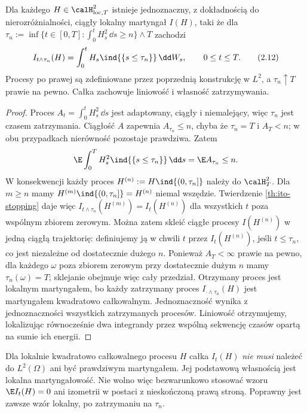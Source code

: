 \begin{twierdzenie}\label{th:ito-local}
Dla każdego $H\in\calH_{\mathrm{loc},T}^2$
istnieje jednoznaczny, z dokładnością do nierozróżnialności,
ciągły lokalny martyngał $I(H)$, taki że dla
$\tau_n:=\inf\{t\in[0,T]:\int_0^t H_s^2\,\dd s\ge n\}\wedge T$
zachodzi
\[
I_{t\wedge\tau_n}(H)
=\int_0^tH_s\ind{\{s\le\tau_n\}}\,\dd W_s,
\qquad 0\le t\le T.
\tag{2.12}
\]
Procesy po prawej są zdefiniowane przez
poprzednią konstrukcję w $L^2$, a $\tau_n\uparrow T$
prawie na pewno. Całka zachowuje liniowość i własność
zatrzymywania.
\end{twierdzenie}
\begin{proof}
Proces $A_t=\int_0^tH_s^2\,\dd s$ jest adaptowany,
ciągły i niemalejący, więc $\tau_n$ jest czasem
zatrzymania. Ciągłość $A$ zapewnia
$A_{\tau_n}\le n$, chyba że $\tau_n=T$ i $A_T<n$;
w obu przypadkach nierówność pozostaje prawdziwa.
Zatem
\[
\E\int_0^T H_s^2\ind{\{s\le\tau_n\}}\,\dd s
=\E A_{\tau_n}\le n.
\]
W konsekwencji każdy proces
$H^{(n)}:=H\ind{(0,\tau_n]}$ należy do $\calH_T^2$.
Dla $m\ge n$ mamy
$H^{(m)}\ind{(0,\tau_n]}=H^{(n)}$ niemal wszędzie.
Twierdzenie \ref{th:ito-stopping} daje więc
$I_{t\wedge\tau_n}(H^{(m)})=I_t(H^{(n)})$ dla wszystkich
$t$ poza wspólnym zbiorem zerowym.
Można zatem skleić ciągłe procesy $I(H^{(n)})$
w jedną ciągłą trajektorię: definiujemy ją w chwili $t$
przez $I_t(H^{(n)})$, jeśli $t\le\tau_n$, co jest
niezależne od dostatecznie dużego $n$.
Ponieważ $A_T<\infty$ prawie na pewno, dla każdego
$\omega$ poza zbiorem zerowym przy dostatecznie dużym
$n$ mamy $\tau_n(\omega)=T$; sklejanie obejmuje więc
cały przedział. Otrzymany proces jest lokalnym martyngałem,
bo każdy zatrzymany proces $I_{\cdot\wedge\tau_n}(H)$
jest martyngałem kwadratowo całkowalnym.
Jednoznaczność wynika z jednoznaczności wszystkich
zatrzymanych procesów. Liniowość otrzymujemy,
lokalizując równocześnie dwa integrandy przez
wspólną sekwencję czasów opartą na sumie ich energii.
\end{proof}

\begin{uwaga}
Dla lokalnie kwadratowo całkowalnego procesu $H$ całka
$I_t(H)$ \emph{nie musi} należeć do $L^2(\Omega)$ ani
być prawdziwym martyngałem. Jej podstawową własnością
jest lokalna martyngałowość. Nie wolno więc bezwarunkowo
stosować wzoru $\E I_t(H)=0$ ani izometrii w postaci
z nieskończoną prawą stroną. Poprawny jest zawsze
wzór lokalny, po zatrzymaniu na $\tau_n$.
\end{uwaga}

